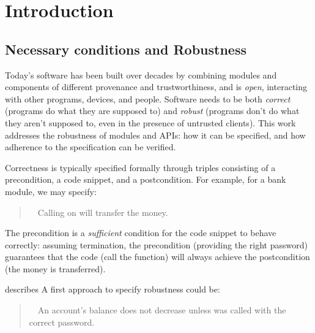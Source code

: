 \section{Introduction}
\label{s:intro}

\subsection{Necessary conditions and Robustness} 
Today's   software has been built 
over decades by combining modules and components of
different provenance and 
trustworthiness, and
is \emph{open}, interacting with other programs, devices, and people.
{Software needs} to be both  {\emph{correct}} ({programs do what they are supposed to}) and   
{\emph{robust}} ({programs don't do what they aren't supposed to, even in the presence of untrusted  {clients}}).  
 {This work  addresses the robustness of modules and APIs: {how it can be specified, and how adherence to the specification can be verified}.}

 {Correctness is} typically specified formally 
 through  triples consisting of a  precondition, a code snippet, and a
 postcondition. 
 For example,  {for a bank module,  we may specify:}
 \begin{quote}
\Scorrect\ \ Calling  on  will transfer the money.
\end{quote}
The precondition is a \emph{sufficient} condition for the {code snippet to behave correctly}: 
assuming termination, the precondition (\eg providing the right 
password) guarantees that
the code (\eg call the  function)
will always achieve the postcondition (the money is transferred).
 
    \vspace{.05in}
 
 \Scorrect  describes 
 A first approach to specify robustness could be:
 

\begin{quote}
\SrobustA\ \ An account's balance does not decrease unless  was called 
with the correct password.
\end{quote}

